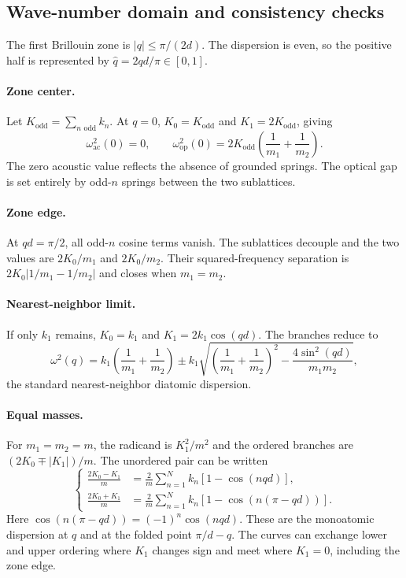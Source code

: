 \subsection{Wave-number domain and consistency checks}

The first Brillouin zone is $|q|\leq\pi/(2d)$. The dispersion is even, so the
positive half is represented by $\hat q=2qd/\pi\in[0,1]$.

\paragraph{Zone center.}
Let $K_{\mathrm{odd}}=\sum_{\text{$n$ odd}}k_n$. At $q=0$,
$K_0=K_{\mathrm{odd}}$ and $K_1=2K_{\mathrm{odd}}$, giving
\begin{equation*}
    \omega_{\mathrm{ac}}^2(0)=0,\qquad
    \omega_{\mathrm{op}}^2(0)=2K_{\mathrm{odd}}
    \left(\frac1{m_1}+\frac1{m_2}\right).
\end{equation*}
The zero acoustic value reflects the absence of grounded springs. The optical
gap is set entirely by odd-$n$ springs between the two sublattices.

\paragraph{Zone edge.}
At $qd=\pi/2$, all odd-$n$ cosine terms vanish. The sublattices decouple and the
two values are $2K_0/m_1$ and $2K_0/m_2$. Their squared-frequency separation is
$2K_0|1/m_1-1/m_2|$ and closes when $m_1=m_2$.

\paragraph{Nearest-neighbor limit.}
If only $k_1$ remains, $K_0=k_1$ and $K_1=2k_1\cos(qd)$. The branches reduce to
\begin{equation*}
    \omega^2(q)=k_1\left(\frac1{m_1}+\frac1{m_2}\right)
    \mathbin{\pm}k_1\sqrt{
        \left(\frac1{m_1}+\frac1{m_2}\right)^2
        -\frac{4\sin^2(qd)}{m_1m_2}},
\end{equation*}
the standard nearest-neighbor diatomic dispersion.

\paragraph{Equal masses.}
For $m_1=m_2=m$, the radicand is $K_1^2/m^2$ and the ordered branches are
$(2K_0\mp|K_1|)/m$. The unordered pair can be written
\begin{equation*}
\left\{
\begin{aligned}
    \frac{2K_0-K_1}{m}
        &=\frac2m\sum_{n=1}^{N}k_n\left[1-\cos(nqd)\right],\\
    \frac{2K_0+K_1}{m}
        &=\frac2m\sum_{n=1}^{N}k_n
          \left[1-\cos\left(n(\pi-qd)\right)\right].
\end{aligned}
\right.
\end{equation*}
Here $\cos(n(\pi-qd))=(-1)^n\cos(nqd)$. These are the monoatomic dispersion at
$q$ and at the folded point $\pi/d-q$. The curves can exchange lower and upper
ordering where $K_1$ changes sign and meet where $K_1=0$, including the zone
edge.

